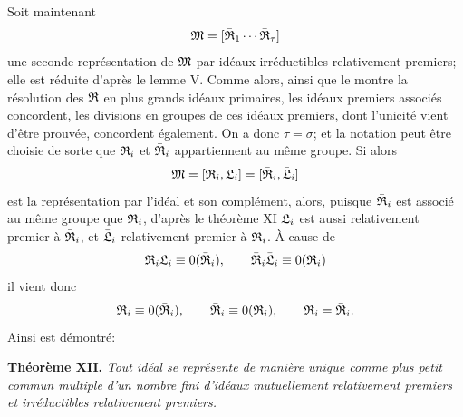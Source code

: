 Soit maintenant
\[
 \mathfrak{M}=[\bar{\mathfrak{R}}_1\cdots\bar{\mathfrak{R}}_\tau]
\]
une seconde représentation de $\mathfrak{M}$ par idéaux irréductibles relativement premiers; elle est réduite d'après le lemme V. Comme alors, ainsi que le montre la résolution des $\mathfrak{R}$ en plus grands idéaux primaires, les idéaux premiers associés concordent, les divisions en groupes de ces idéaux premiers, dont l'unicité vient d'être prouvée, concordent également. On a donc $\tau=\sigma$; et la notation peut être choisie de sorte que $\mathfrak{R}_i$ et $\bar{\mathfrak{R}}_i$ appartiennent au même groupe. Si alors
\[
 \mathfrak{M}=[\mathfrak{R}_i,\mathfrak{L}_i]=[\bar{\mathfrak{R}}_i,\bar{\mathfrak{L}}_i]
\]
est la représentation par l'idéal et son complément, alors, puisque $\bar{\mathfrak{R}}_i$ est associé au même groupe que $\mathfrak{R}_i$, d'après le théorème XI $\mathfrak{L}_i$ est aussi relativement premier à $\bar{\mathfrak{R}}_i$, et $\bar{\mathfrak{L}}_i$ relativement premier à $\mathfrak{R}_i$. À cause de
\[
 \mathfrak{R}_i\mathfrak{L}_i\equiv0(\bar{\mathfrak{R}}_i),
 \qquad
 \bar{\mathfrak{R}}_i\bar{\mathfrak{L}}_i\equiv0(\mathfrak{R}_i)
\]
il vient donc
\[
 \mathfrak{R}_i\equiv0(\bar{\mathfrak{R}}_i),
 \qquad
 \bar{\mathfrak{R}}_i\equiv0(\mathfrak{R}_i),
 \qquad
 \mathfrak{R}_i=\bar{\mathfrak{R}}_i.
\]
Ainsi est démontré:

\textbf{Théorème XII.} \emph{Tout idéal se représente de manière unique comme plus petit commun multiple d'un nombre fini d'idéaux mutuellement relativement premiers et irréductibles relativement premiers.}
